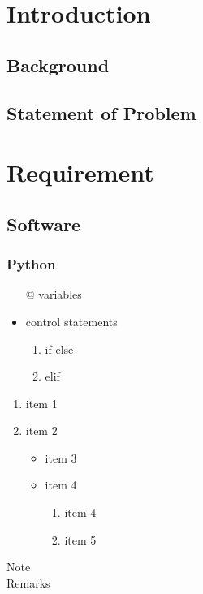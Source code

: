 \documentclass[12pt,a4paper]{report}
\begin{document}
\tableofcontents

\chapter{Introduction}
\section{Background}
\lipsum[1]
\section{Statement of Problem}
\lipsum[2]

\chapter{Requirement}
\section{Software}
\subsection{Python}
\lipsum[4]
\begin{itemize}
    \item[@] variables
    \item control statements
    \begin{enumerate}
        \item if-else
        \item elif
    \end{enumerate}
\end{itemize}
\begin{enumerate}
    \item item 1
    \item item 2
    \begin{itemize}
        \item item 3
        \item item 4
        \begin{enumerate}
            \item item 4
            \item item 5
        \end{enumerate}
    \end{itemize}
\end{enumerate}
\begin{description}
    \item[Note] \lipsum[4] 
    \item[Remarks] \lipsum[5] 
\end{description}
\end{document}

